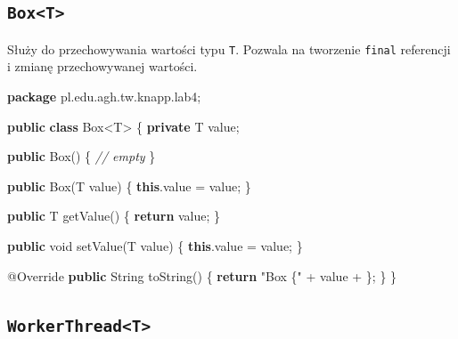 \documentclass[11pt]{article}
\newenvironment{Shaded}{}{}
\newcommand{\KeywordTok}[1]{\textcolor[rgb]{0.00,0.44,0.13}{\textbf{{#1}}}}
\newcommand{\DataTypeTok}[1]{\textcolor[rgb]{0.56,0.13,0.00}{{#1}}}
\newcommand{\CharTok}[1]{\textcolor[rgb]{0.25,0.44,0.63}{{#1}}}
\newcommand{\StringTok}[1]{\textcolor[rgb]{0.25,0.44,0.63}{{#1}}}
\newcommand{\CommentTok}[1]{\textcolor[rgb]{0.38,0.63,0.69}{\textit{{#1}}}}
\newcommand{\FunctionTok}[1]{\textcolor[rgb]{0.02,0.16,0.49}{{#1}}}
\newcommand{\NormalTok}[1]{{#1}}
\newcommand{\ImportTok}[1]{{#1}}
\newcommand{\ControlFlowTok}[1]{\textcolor[rgb]{0.00,0.44,0.13}{\textbf{{#1}}}}
\newcommand{\OperatorTok}[1]{\textcolor[rgb]{0.40,0.40,0.40}{{#1}}}
\newcommand{\BuiltInTok}[1]{{#1}}
\newcommand{\AttributeTok}[1]{\textcolor[rgb]{0.49,0.56,0.16}{{#1}}}
\begin{document}
    \hypertarget{boxt}{%
\subsection{\texorpdfstring{\texttt{Box\textless{}T\textgreater{}}}{Box\textless T\textgreater{}}}\label{boxt}}

Służy do przechowywania wartości typu \texttt{T}. Pozwala na tworzenie
\texttt{final} referencji i zmianę przechowywanej wartości.

\begin{Shaded}
\begin{Highlighting}[]
\KeywordTok{package}\ImportTok{ pl}\OperatorTok{.}\ImportTok{edu}\OperatorTok{.}\ImportTok{agh}\OperatorTok{.}\ImportTok{tw}\OperatorTok{.}\ImportTok{knapp}\OperatorTok{.}\ImportTok{lab4}\OperatorTok{;}

\KeywordTok{public} \KeywordTok{class} \BuiltInTok{Box}\OperatorTok{\textless{}}\NormalTok{T}\OperatorTok{\textgreater{}} \OperatorTok{\{}
    \KeywordTok{private}\NormalTok{ T value}\OperatorTok{;}

    \KeywordTok{public} \BuiltInTok{Box}\OperatorTok{()} \OperatorTok{\{}
        \CommentTok{// empty}
    \OperatorTok{\}}

    \KeywordTok{public} \BuiltInTok{Box}\OperatorTok{(}\NormalTok{T value}\OperatorTok{)} \OperatorTok{\{}
        \KeywordTok{this}\OperatorTok{.}\FunctionTok{value} \OperatorTok{=}\NormalTok{ value}\OperatorTok{;}
    \OperatorTok{\}}

    \KeywordTok{public}\NormalTok{ T }\FunctionTok{getValue}\OperatorTok{()} \OperatorTok{\{}
        \ControlFlowTok{return}\NormalTok{ value}\OperatorTok{;}
    \OperatorTok{\}}

    \KeywordTok{public} \DataTypeTok{void} \FunctionTok{setValue}\OperatorTok{(}\NormalTok{T value}\OperatorTok{)} \OperatorTok{\{}
        \KeywordTok{this}\OperatorTok{.}\FunctionTok{value} \OperatorTok{=}\NormalTok{ value}\OperatorTok{;}
    \OperatorTok{\}}

    \AttributeTok{@Override}
    \KeywordTok{public} \BuiltInTok{String} \FunctionTok{toString}\OperatorTok{()} \OperatorTok{\{}
        \ControlFlowTok{return} \StringTok{"Box \{"} \OperatorTok{+}\NormalTok{ value }\OperatorTok{+} \CharTok{\textquotesingle{}\}\textquotesingle{}}\OperatorTok{;}
    \OperatorTok{\}}
\OperatorTok{\}}
\end{Highlighting}
\end{Shaded}

    \hypertarget{workerthreadt}{%
\subsection{\texorpdfstring{\texttt{WorkerThread\textless{}T\textgreater{}}}{WorkerThread\textless T\textgreater{}}}\label{workerthreadt}}
\end{document}
